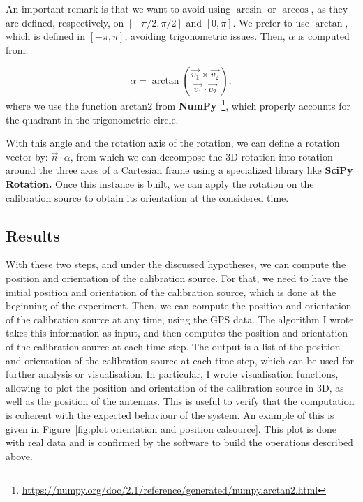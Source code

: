 \documentclass[../../thesis.tex]{subfiles}
\begin{document}
An important remark is that we want to avoid using $\arcsin$ or $\arccos$, as they are defined, respectively, on $[-\pi/2, \pi/2]$ and $[0, \pi]$. We prefer to use $\arctan$, which is defined in $[-\pi, \pi]$, avoiding trigonometric issues. Then, $\alpha$ is computed from:

\begin{equation}
    \alpha = \arctan(\frac{ \vec{v_1} \times \vec{v_2}}{\vec{v_1} \cdot \vec{v_2}}),
\end{equation}
where we use the function arctan2 from \textbf{NumPy}~\footnote{\url{https://numpy.org/doc/2.1/reference/generated/numpy.arctan2.html}}, which properly accounts for the quadrant in the trigonometric circle.

With this angle and the rotation axis of the rotation, we can define a rotation vector by: $\vec{n} \cdot \alpha$, from which we can decompose the 3D rotation into rotation around the three axes of a Cartesian frame using a specialized library like \textbf{SciPy Rotation.} Once this instance is built, we can apply the rotation on the calibration source to obtain its orientation at the considered time.

\subsection{Results}
With these two steps, and under the discussed hypotheses, we can compute the position and orientation of the calibration source. For that, we need to have the initial position and orientation of the calibration source, which is done at the beginning of the experiment. Then, we can compute the position and orientation of the calibration source at any time, using the GPS data.
The algorithm I wrote takes this information as input, and then computes the position and orientation of the calibration source at each time step. The output is a list of the position and orientation of the calibration source at each time step, which can be used for further analysis or visualisation. In particular, I wrote visualisation functions, allowing to plot the position and orientation of the calibration source in 3D, as well as the position of the antennas. This is useful to verify that the computation is coherent with the expected behaviour of the system.
An example of this is given in Figure~\ref{fig:plot orientation and position calsource}. This plot is done with real data and is confirmed by the software to build the operations described above.
\end{document}
